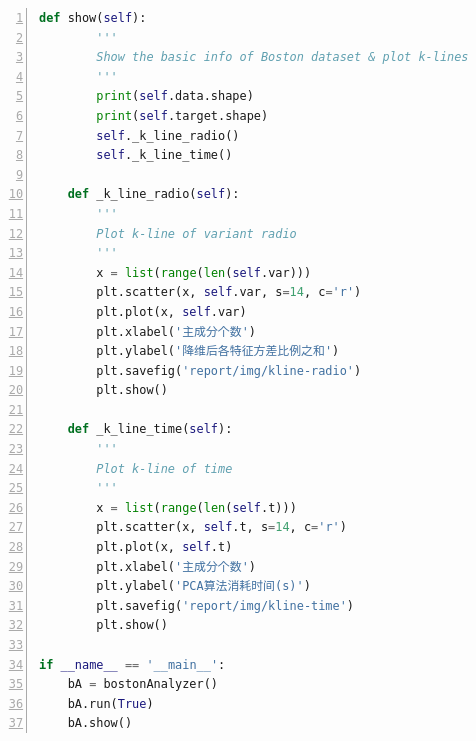 \documentclass[12pt,a4paper]{article}
\theoremstyle{definition}
\begin{document}
\begin{appendix}
\begin{lstlisting}[language=Python,
	numbers=left,
	keywordstyle=\color{blue!70},
	frame=shadowbox,
	breaklines=True]
    def show(self):
        '''
        Show the basic info of Boston dataset & plot k-lines
        '''
        print(self.data.shape)
        print(self.target.shape)
        self._k_line_radio()
        self._k_line_time()

    def _k_line_radio(self):
        '''
        Plot k-line of variant radio
        '''
        x = list(range(len(self.var)))
        plt.scatter(x, self.var, s=14, c='r')
        plt.plot(x, self.var)
        plt.xlabel('主成分个数')
        plt.ylabel('降维后各特征方差比例之和')
        plt.savefig('report/img/kline-radio')
        plt.show()

    def _k_line_time(self):
        '''
        Plot k-line of time
        '''
        x = list(range(len(self.t)))
        plt.scatter(x, self.t, s=14, c='r')
        plt.plot(x, self.t)
        plt.xlabel('主成分个数')
        plt.ylabel('PCA算法消耗时间(s)')
        plt.savefig('report/img/kline-time')
        plt.show()

if __name__ == '__main__':
    bA = bostonAnalyzer()
    bA.run(True)
    bA.show()
	\end{lstlisting}
	
\end{appendix}

\end{document}
